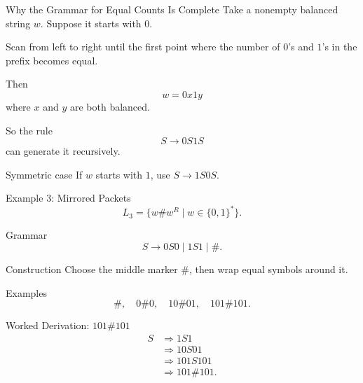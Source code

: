 \documentclass[aspectratio=169,10pt]{beamer}
\newcommand{\der}{\Rightarrow}
\begin{document}
\begin{frame}{Why the Grammar for Equal Counts Is Complete}
\small
Take a nonempty balanced string \(w\). Suppose it starts with \(0\).

\vspace{0.4em}
Scan from left to right until the first point where the number of \(0\)'s and \(1\)'s in the prefix becomes equal.

Then
\[
w=0x1y
\]
where \(x\) and \(y\) are both balanced.

\vspace{0.5em}
So the rule
\[
S\to 0S1S
\]
can generate it recursively.

\begin{alertblock}{Symmetric case}
If \(w\) starts with \(1\), use \(S\to 1S0S\).
\end{alertblock}
\end{frame}

\begin{frame}{Example 3: Mirrored Packets}
\small
\[
L_3=\{w\#w^R\mid w\in\{0,1\}^*\}.
\]

\begin{exampleblock}{Grammar}
\[
S\to 0S0\mid 1S1\mid\#.
\]
\end{exampleblock}

\begin{block}{Construction}
Choose the middle marker \(\#\), then wrap equal symbols around it.
\end{block}

\begin{exampleblock}{Examples}
\[
\#,\quad 0\#0,
\quad 10\#01,
\quad 101\#101.
\]
\end{exampleblock}
\end{frame}

\begin{frame}{Worked Derivation: \(101\#101\)}
\small
\begin{align*}
S
&\der 1S1\\
&\der 10S01\\
&\der 101S101\\
&\der 101\#101.
\end{align*}

\begin{center}
\end{center}
\end{frame}
\end{document}
